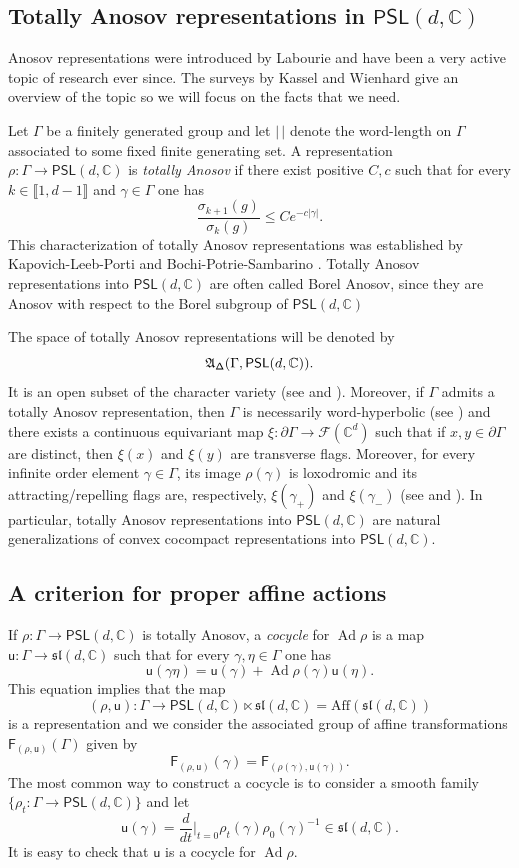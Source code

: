 \documentclass{amsart}
\theoremstyle{plain}
\theoremstyle{definition}
\theoremstyle{remark}
\newcommand{\Ad}{\operatorname{Ad}}
\newcommand{\PSL}{\mathsf{PSL}}
\newcommand{\aff}[1]{\sf{F}_{#1}}
\renewcommand{\sf}[1]{{\mathsf{#1}}}
\newcommand{\cal}{\mathcal}
\newcommand{\lb}{\llbracket}
\newcommand{\rb}{\rrbracket}
\newcommand{\C}{\mathbb C}
\renewcommand{\sl}{\mathfrak{sl}}
\newcommand{\<}{\left <}
\renewcommand{\>}{\right >}
\newcommand{\G}{\Gamma}
\newcommand{\g}{\gamma}
\newcommand{\co}{\sf u}
\renewcommand{\C}{\mathbb C}
\begin{document}
\subsection{Totally Anosov representations in $\PSL(d,\mathbb C)$}\label{Anosovpreliminaries1} 
Anosov representations were introduced by Labourie \cite{labourie} and have been a very active topic of research ever since. 
The surveys by Kassel \cite{KasselICM} and
Wienhard \cite{WienhardICM}  give an overview of the topic so we will focus on the facts that we need.


Let $\G$ be a finitely generated group and let $|\,|$ denote the word-length on $\G$ associated to some fixed  finite generating set. 
A representation $\rho:\G\to\PSL(d,\C)$ is \emph{totally Anosov} if there exist positive $C,c$ such that for every $k\in\lb1,d-1\rb$ and $\g\in\G$ one has 
$$\frac{\sigma_{k+1}(g)}{\sigma_{k}(g)}\leq Ce^{-c|\g|}.$$
This characterization of totally Anosov representations was established by Kapovich-Leeb-Porti \cite{KLP} and Bochi-Potrie-Sambarino \cite{BPS}. Totally Anosov representations into $\PSL(d,\C)$  are often called Borel Anosov, since they are Anosov with respect to the Borel subgroup of $\PSL(d,\C)$ 

The space of totally Anosov representations will be denoted by 
$$\frak A_{\sf\Delta}(\G,\PSL(d,\C)).$$ 
It is an open subset of the character variety (see \cite{labourie} and \cite{GW}). Moreover, if $\Gamma$ admits a totally Anosov representation,
then $\G$ is necessarily word-hyperbolic (see \cite{KLP}) and there exists a continuous equivariant map $\xi:\partial\G\to\cal F(\C^d)$ such that if $x,y\in\partial\G$ are distinct, 
then $\xi(x)$ and $\xi(y)$ are transverse flags. Moreover, for every infinite order element $\g\in\G$,  its image $\rho(\g)$ is loxodromic and its attracting/repelling flags are, 
respectively, $\xi(\g_+)$ and $\xi(\g_-)$ (see \cite{labourie} and \cite{GW}). In particular, totally Anosov representations into $\PSL(d,\C)$ are natural
generalizations of convex cocompact representations into $\PSL(d,\C)$.



\subsection{A criterion for proper affine actions}
\label{criterion}



If $\rho:\G\to\PSL(d,\C)$ is totally Anosov, a \emph{cocycle} for $\Ad\rho$ is a map $\co:\G\to\sl(d,\C)$ such that for every $\g,\eta\in\G$ one has 
$$\co(\g\eta)=\co(\g)+\Ad\rho(\g)\co(\eta).$$ 
This equation implies that the map 
$$(\rho,\co):\G\to\PSL(d,\C)\ltimes\sl(d,\C)=\mathrm{Aff}(\sl(d,\C))$$
 is a representation and we consider the associated group of affine transformations $\aff{(\rho,\co)}(\G)$ given by 
 $$\aff{(\rho,\co)}(\g)=\aff{(\rho(\g),\co(\g))}.$$ 
 The most common way to construct a cocycle is to consider a smooth family $\{\rho_t:\Gamma\to\PSL(d,\C)\}$ and
 let 
 $$\co(\gamma)=\frac{d}{dt}\Big|_{t=0}\rho_t(\g)\rho_0(\g)^{-1}\in\sl(d,\C).$$
 It is easy to check that $\co$ is a cocycle for $\Ad\rho$.
\end{document}
